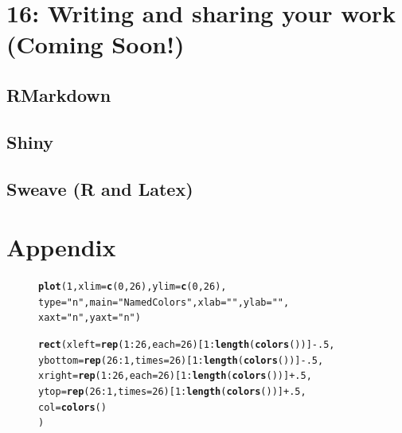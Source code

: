 \documentclass{tufte-book}\usepackage[]{graphicx}\usepackage[]{color}
\makeatletter
\newcommand{\hlnum}[1]{\textcolor[rgb]{0.686,0.059,0.569}{#1}}%
\newcommand{\hlstr}[1]{\textcolor[rgb]{0.192,0.494,0.8}{#1}}%
\newcommand{\hlopt}[1]{\textcolor[rgb]{0,0,0}{#1}}%
\newcommand{\hlstd}[1]{\textcolor[rgb]{0.345,0.345,0.345}{#1}}%
\newcommand{\hlkwc}[1]{\textcolor[rgb]{0.333,0.667,0.333}{#1}}%
\newcommand{\hlkwd}[1]{\textcolor[rgb]{0.737,0.353,0.396}{\textbf{#1}}}%
\newenvironment{kframe}{%
 \def\at@end@of@kframe{}%
 \ifinner\ifhmode%
  \def\at@end@of@kframe{\end{minipage}}%
  \begin{minipage}{\columnwidth}%
 \fi\fi%
 \def\FrameCommand##1{\hskip\@totalleftmargin \hskip-\fboxsep
 \colorbox{shadecolor}{##1}\hskip-\fboxsep
     \hskip-\linewidth \hskip-\@totalleftmargin \hskip\columnwidth}%
 \MakeFramed {\advance\hsize-\width
   \@totalleftmargin\z@ \linewidth\hsize
   \@setminipage}}%
 {\par\unskip\endMakeFramed%
 \at@end@of@kframe}
\newenvironment{knitrout}{}{} %
\makeatother
\begin{document}
\begin{footnotesize}
\chapter{16: Writing and sharing your work (Coming Soon!)}
\label{ch:16}

\section{RMarkdown}
\section{Shiny}
\section{Sweave (R and Latex)}



\chapter{Appendix}
\label{ch:X}

\begin{figure}[h]
\begin{footnotesize}
\begin{knitrout}
\color{fgcolor}\begin{kframe}
\begin{alltt}
\hlkwd{plot}\hlstd{(}\hlnum{1}\hlstd{,} \hlkwc{xlim} \hlstd{=} \hlkwd{c}\hlstd{(}\hlnum{0}\hlstd{,} \hlnum{26}\hlstd{),} \hlkwc{ylim} \hlstd{=} \hlkwd{c}\hlstd{(}\hlnum{0}\hlstd{,} \hlnum{26}\hlstd{),}
     \hlkwc{type} \hlstd{=} \hlstr{"n"}\hlstd{,} \hlkwc{main} \hlstd{=} \hlstr{"Named Colors"}\hlstd{,} \hlkwc{xlab} \hlstd{=} \hlstr{""}\hlstd{,} \hlkwc{ylab} \hlstd{=} \hlstr{""}\hlstd{,}
     \hlkwc{xaxt} \hlstd{=} \hlstr{"n"}\hlstd{,} \hlkwc{yaxt} \hlstd{=} \hlstr{"n"}\hlstd{)}

\hlkwd{rect}\hlstd{(}\hlkwc{xleft} \hlstd{=} \hlkwd{rep}\hlstd{(}\hlnum{1}\hlopt{:}\hlnum{26}\hlstd{,} \hlkwc{each} \hlstd{=} \hlnum{26}\hlstd{)[}\hlnum{1}\hlopt{:}\hlkwd{length}\hlstd{(}\hlkwd{colors}\hlstd{())]} \hlopt{-} \hlnum{.5}\hlstd{,}
     \hlkwc{ybottom} \hlstd{=} \hlkwd{rep}\hlstd{(}\hlnum{26}\hlopt{:}\hlnum{1}\hlstd{,} \hlkwc{times} \hlstd{=} \hlnum{26}\hlstd{)[}\hlnum{1}\hlopt{:}\hlkwd{length}\hlstd{(}\hlkwd{colors}\hlstd{())]} \hlopt{-} \hlnum{.5}\hlstd{,}
     \hlkwc{xright} \hlstd{=} \hlkwd{rep}\hlstd{(}\hlnum{1}\hlopt{:}\hlnum{26}\hlstd{,} \hlkwc{each} \hlstd{=} \hlnum{26}\hlstd{)[}\hlnum{1}\hlopt{:}\hlkwd{length}\hlstd{(}\hlkwd{colors}\hlstd{())]} \hlopt{+} \hlnum{.5}\hlstd{,}
     \hlkwc{ytop} \hlstd{=} \hlkwd{rep}\hlstd{(}\hlnum{26}\hlopt{:}\hlnum{1}\hlstd{,} \hlkwc{times} \hlstd{=} \hlnum{26}\hlstd{)[}\hlnum{1}\hlopt{:}\hlkwd{length}\hlstd{(}\hlkwd{colors}\hlstd{())]} \hlopt{+} \hlnum{.5}\hlstd{,}
     \hlkwc{col} \hlstd{=} \hlkwd{colors}\hlstd{()}
     \hlstd{)}


\end{alltt}
\end{kframe}
\end{knitrout}
\end{footnotesize}
\end{figure}
\end{footnotesize}
\end{document}
